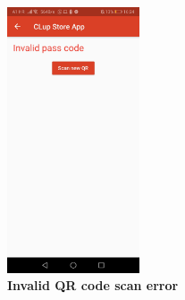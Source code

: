 \begin{figure}[!htb]
\centering
\includegraphics[width=0.35\textwidth]{Images/InvalidScan}
\captionsetup{justification=centering}
\caption{\label{fig:appandroiderr3}\textbf{Invalid QR code scan error}}
\end{figure}

